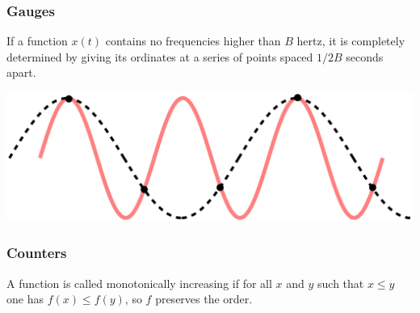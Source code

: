 \begin{frame}
    \frametitle{Gauges}

    \begin{theorem}
        If a function $x(t)$ contains no frequencies higher than $B$ hertz, it
        is completely determined by giving its ordinates at a series of points
        spaced $1 / 2B$ seconds apart.
    \end{theorem}

    \begin{center}
        \includegraphics[width=0.8\linewidth]{CPT-sound-nyquist-thereom-1_5percycle.png}
    \end{center}
\end{frame}

\begin{frame}
    \frametitle{Counters}

    \begin{definition}
        A function is called monotonically increasing if for all $x$ and
        $y$ such that $x \leq y$ one has
        $f(x) \leq f(y)$, so $f$
        preserves the order.
    \end{definition}

    \begin{center}
    \end{center}
\end{frame}

